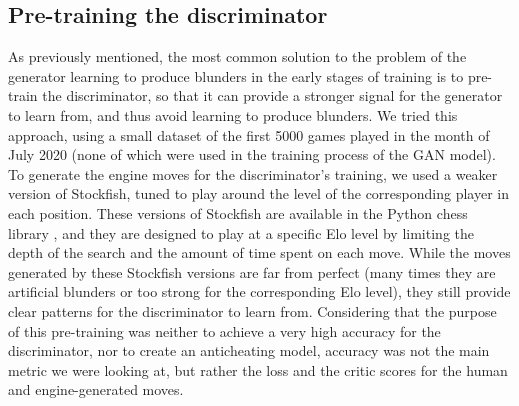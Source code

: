 \subsection*{Pre-training the discriminator}
\label{section:pretraining_discriminator}
As previously mentioned, the most common solution to the problem of the generator learning to produce blunders in the early stages of training is to pre-train the discriminator, so that it can provide a stronger signal for the generator to learn from, and thus avoid learning to produce blunders.
We tried this approach, using a small dataset of the first 5000 games played in the month of July 2020 (none of which were used in the training process of the GAN model).
To generate the engine moves for the discriminator's training, we used a weaker version of Stockfish, tuned to play around the level of the corresponding player in each position.
These versions of Stockfish are available in the Python chess library \cite{python_stockfish}, and they are designed to play at a specific Elo level by limiting the depth of the search and the amount of time spent on each move.
While the moves generated by these Stockfish versions are far from perfect (many times they are artificial blunders or too strong for the corresponding Elo level), they still provide clear patterns for the discriminator to learn from.
Considering that the purpose of this pre-training was neither to achieve a very high accuracy for the discriminator, nor to create an anticheating model, accuracy was not the main metric we were looking at, but rather the loss and the critic scores for the human and engine-generated moves.

